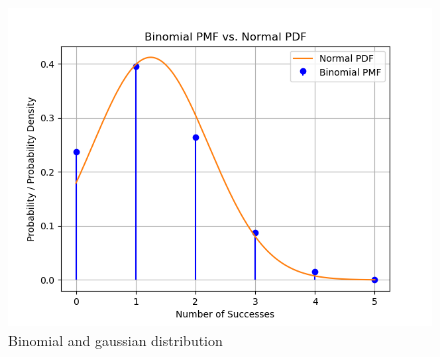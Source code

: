 \documentclass[journal,11pt,onecolumn]{IEEEtran}
\begin{document}
\begin{figure}[ht!]
	\centering
	\includegraphics[width=\columnwidth]{figs/fig.png}
	\caption{Binomial and gaussian distribution}
	\label{fig:gauss9.3.3}
\end{figure}
\end{document}
